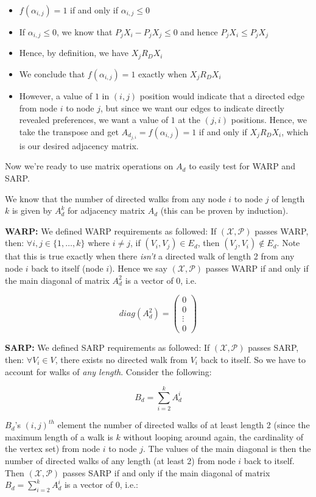 \documentclass{article} %
\begin{document}
\begin{itemize}
    \item $f(\alpha_{i,j})=1$ if and only if $\alpha_{i,j}\leq0$
    \item If $\alpha_{i,j}\leq0$, we know that $P_jX_i-P_jX_j\leq0$ and hence $P_jX_i\leq P_jX_j$
    \item Hence, by definition, we have $X_j R_D X_i$
    \item We conclude that $f(\alpha_{i,j})=1$ exactly when $X_j R_D X_i$
    \item However, a value of $1$ in $(i,j)$ position would indicate that a directed edge from node $i$ to node $j$, but since we want our edges to indicate directly revealed preferences, we want a value of $1$ at the $(j,i)$ positions. Hence, we take the transpose and get $A_{d_{j,i}}=f(\alpha_{i,j})=1$ if and only if $X_j R_D X_i$, which is our desired adjacency matrix.
\end{itemize}

Now we're ready to use matrix operations on $A_d$ to easily test for WARP and SARP.


We know that the number of directed walks from any node $i$ to node $j$ of length $k$ is given by $A^k_d$ for adjacency matrix $A_d$ (this can be proven by induction). 


\textbf{WARP:} We defined WARP requirements as followed: If $(\mathcal{X},\mathcal{P})$ passes WARP, then: $\forall i,j\in\{1,\dots,k\}$ where $i\not=j$, if $(V_i,V_j)\in E_d$, then $(V_j, V_i)\not\in E_d$. Note that this is true exactly when there \textit{isn't} a directed walk of length 2 from any node $i$ back to itself (node $i$). Hence we say $(\mathcal{X},\mathcal{P})$ passes WARP if and only if the main diagonal of matrix $A_d^2$ is a vector of 0, i.e.

\[
diag(A_d^2) =
 \begin{pmatrix}
  0 \\
  0 \\
  \vdots \\
  0
 \end{pmatrix}
\]

\textbf{SARP:} We defined SARP requirements as followed: If $(\mathcal{X},\mathcal{P})$ passes SARP, then: $\forall V_i \in V$, there exists no directed walk from $V_i$ back to itself. So we have to account for walks of \textit{any length}. Consider the following:

$$B_d=\sum_{i=2}^{k}A_d^i$$

$B_d$'s $(i,j)^{th}$ element the number of directed walks of at least length 2 (since the maximum length of a walk is $k$ without looping around again, the cardinality of the vertex set) from node $i$ to node $j$. The values of the main diagonal is then the number of directed walks of any length (at least 2) from node $i$ back to itself. Then $(\mathcal{X},\mathcal{P})$ passes SARP if and only if the main diagonal of matrix $B_d=\sum_{i=2}^{k}A_d^i$ is a vector of 0, i.e.:
\end{document}
